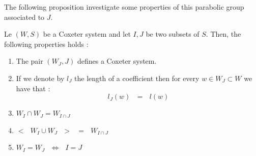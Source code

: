 \documentclass[envcountsame,envcountchap]{svmono}
\newcommand{\sub}{\subset}
\newcommand{\qq}{\text{ }}
\begin{document}
The following proposition investigate some properties of this parabolic group associated to $J$.
\begin{proposition}
	Le $(W,S)$ be a Coxeter system and let $I,J$ be two subsets of $S$. Then, the following properties holds :
	\begin{enumerate}
		\item The pair $(W_J,J)$ defines a Coxeter system.
		\item If we denote by $l_J$ the length of a coefficient then for every $w\in W_J\sub W$ we have that :
		\begin{equation}
		l_J(w)\qq=\qq l(w)
		\end{equation} 
		\item\begin{center}
			$W_I\cap W_J=W_{I\cap J}$
		\end{center}
		\item \begin{center}
			$<\qq W_I\cup W_J\qq >\qq=\qq W_{I\cap J}$
		\end{center}
		\item\begin{center}
			 $W_I=W_J\qq \iff \qq I=J$
		\end{center}
	\end{enumerate} 
\end{proposition}
\end{document}
